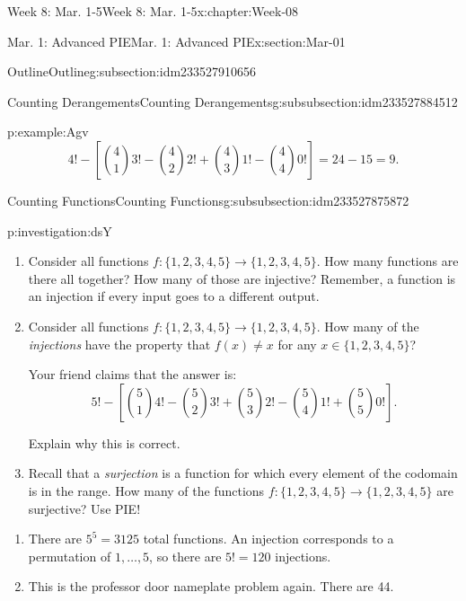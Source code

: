 \documentclass[oneside,10pt,]{book}
\numberwithin{equation}{section}
\begin{document}
\begin{chapterptx}{Week 8: Mar. 1-5}{}{Week 8: Mar. 1-5}{}{}{x:chapter:Week-08}
\begin{sectionptx}{Mar. 1: Advanced PIE}{}{Mar. 1: Advanced PIE}{}{}{x:section:Mar-01}
\begin{subsectionptx}{Outline}{}{Outline}{}{}{g:subsection:idm233527910656}
\begin{subsubsectionptx}{Counting Derangements}{}{Counting Derangements}{}{}{g:subsubsection:idm233527884512}
\begin{example}{}{p:example:Agv}
\begin{equation*}
4! - \left[{4 \choose 1}3! - {4 \choose 2}2! + {4 \choose 3} 1! - {4 \choose 4}0!\right] = 24 - 15 = 9\text{.}
\end{equation*}
%
\end{example}
\end{subsubsectionptx}
%
%
\typeout{************************************************}
\typeout{************************************************}
%
\begin{subsubsectionptx}{Counting Functions}{}{Counting Functions}{}{}{g:subsubsection:idm233527875872}
%
\begin{investigation}{}{p:investigation:dsY}%
%
\begin{enumerate}
\item{}Consider all functions \(f: \{1,2,3,4,5\} \to \{1,2,3,4,5\}\). How many functions are there all together? How many of those are injective? Remember, a function is an injection if every input goes to a different output.%
\item{}Consider all functions \(f: \{1,2,3,4,5\} \to \{1,2,3,4,5\}\). How many of the \emph{injections} have the property that \(f(x) \ne x\) for any \(x \in \{1,2,3,4,5\}\)? %
\par
Your friend claims that the answer is:%
\begin{equation*}
5! - \left[ {5\choose 1}4! - {5 \choose 2}3! + {5\choose 3}2! - {5 \choose 4}1! + {5\choose 5}0! \right]\text{.}
\end{equation*}
%
\par
Explain why this is correct.%
\item{}Recall that a \emph{surjection}  is a function for which every element of the codomain is in the range. How many of the functions \(f: \{1,2,3,4,5\} \to \{1,2,3,4,5\}\) are surjective? Use PIE!%
\end{enumerate}
%
\par\smallskip%
\noindent\hypertarget{g:solution:idm233527859408}{}%
\begin{enumerate}
\item{}There are \(5^5 = 3125\) total functions. An injection corresponds to a permutation of \(1, \ldots, 5\), so there are \(5! = 120\) injections.%
\item{}This is the professor door nameplate problem again. There are 44.%

\end{enumerate}
\end{investigation}
\end{subsubsectionptx}
\end{subsectionptx}
\end{sectionptx}
\end{chapterptx}
\end{document}
